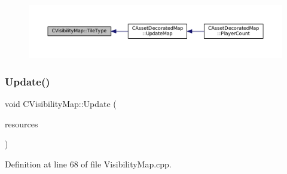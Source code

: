 \begin{figure}[H]
\begin{center}
\leavevmode
\includegraphics[width=350pt]{classCVisibilityMap_a8517fe52114dd469093fd1bd13482733_icgraph}
\end{center}
\end{figure}
\hypertarget{classCVisibilityMap_a5ca9902ef0bc2714617719800e20aa19}{}\label{classCVisibilityMap_a5ca9902ef0bc2714617719800e20aa19} 
\subsubsection{\texorpdfstring{Update()}{Update()}}
{\footnotesize\ttfamily void C\+Visibility\+Map\+::\+Update (\begin{DoxyParamCaption}\item[{const std\+::list$<$ std\+::weak\+\_\+ptr$<$ \hyperlink{classCPlayerAsset}{C\+Player\+Asset} $>$ $>$ \&}]{resources }\end{DoxyParamCaption})}



Definition at line 68 of file Visibility\+Map.\+cpp.


